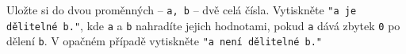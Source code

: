 \question[30]
Uložte si do dvou proměnných -- \texttt{a, b} -- dvě celá čísla. Vytiskněte
\texttt{"a je dělitelné b."}, kde \texttt{a} a \texttt{b} nahradíte jejich
hodnotami, pokud \texttt{a} dává zbytek \texttt{0} po dělení \texttt{b}. V
opačném případě vytiskněte \texttt{"a není dělitelné b."}